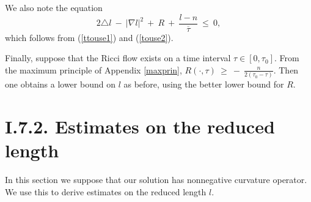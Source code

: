 \documentclass[12pt]{amsart}
\numberwithin{equation}{section}
\theoremstyle{plain}
\theoremstyle{definition}
\theoremstyle{remark}
\begin{document}
We also note the equation
\begin{equation} \label{illustrate2}
2 \triangle l \: - \: |\nabla l|^2  \: + \: R \:  + \:
\frac{l-n}{\overline{\tau}} \: \le \: 0,
\end{equation}
which follows from (\ref{ttouse1}) and
(\ref{touse2}).

Finally, suppose that the Ricci flow exists on a time interval
$\tau \in [0, \tau_0]$. From the maximum principle of
Appendix \ref{maxprin}, $R(\cdot, \tau) \: \ge \: - \: \frac{n}{2(\tau_0 - \tau)}$.
Then one obtains a lower bound on $l$ as before, using the
better lower bound for $R$.

\section{I.7.2. Estimates on the reduced length}

In this section we
suppose that our solution has nonnegative curvature operator.
We use this to derive estimates on the reduced length $l$.
\end{document}
